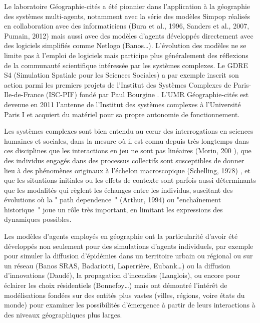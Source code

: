 Le laboratoire Géographie-cités a été pionnier dans l’application à la géographie des systèmes multi-agents, notamment avec la série des modèles Simpop réalisés en collaboration avec des informaticiens (Bura et al., 1996, Sanders et al., 2007, Pumain, 2012) mais aussi avec des modèles d’agents développés directement avec des logiciels simplifiés comme Netlogo (Banos…). L’évolution des modèles ne se limite pas à l’emploi de logiciels mais participe plus généralement des réflexions de la communauté scientifique intéressée par les systèmes complexes. Le GDRE S4 (Simulation Spatiale pour les Sciences Sociales) a par exemple inscrit son action parmi les premiers projets de l’Institut des Systèmes Complexes de Paris-Ile-de-France (ISC-PIF) fondé par Paul Bourgine . L’UMR  Géographie-cités est devenue en 2011 l’antenne  de l’Institut des systèmes complexes à l’Université Paris I et acquiert du matériel pour sa propre autonomie de fonctionnement.

Les systèmes complexes sont bien entendu au cœur des interrogations en sciences humaines et sociales, dans la mesure où il est connu depuis très longtemps dans ces disciplines que les interactions en jeu ne sont pas linéaires   (Morin, 200 ), que des individus engagés dans des processus collectifs sont susceptibles de donner lieu à des phénomènes originaux à l’échelon macroscopique (Schelling, 1978) , et que les situations initiales ou les effets de contexte sont parfois aussi déterminants que les modalités qui règlent les échanges entre les individus, suscitant des évolutions où la " path dependence "  (Arthur, 1994) ou "enchaînement historique " joue un rôle très important, en limitant les expressions des dynamiques possibles.

Les modèles d’agents employés en géographie ont la particularité d’avoir été développés non seulement pour des simulations d’agents individuels, par exemple pour simuler la diffusion d’épidémies dans un territoire urbain ou régional ou sur un réseau (Banos SRAS, Badariotti, Laperrière, Eubank…) ou la diffusion d’innovations (Daudé), la propagation d’incendies (Langlois), ou encore pour éclairer les choix résidentiels (Bonnefoy…) mais ont démontré l’intérêt de modélisations fondées sur des entités plus vastes (villes, régions, voire états du monde) pour examiner les possibilités d’émergence à partir de leurs interactions à des niveaux géographiques plus larges. 


